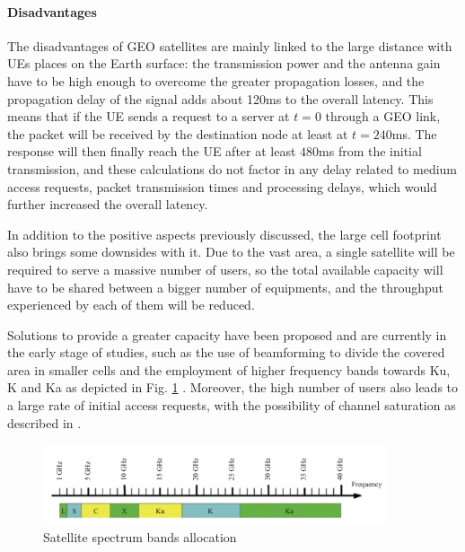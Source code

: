 \paragraph{Disadvantages}
The disadvantages of \ac{GEO} satellites are mainly linked to the large distance with \ac{UE}s places on the Earth surface: the transmission power and the antenna gain have to be high enough to overcome the greater propagation losses, and the propagation delay of the signal adds about 120ms to the overall latency. This means that if the \ac{UE} sends a request to a server at $t=0$ through a \ac{GEO} link, the packet will be received by the destination node at least at $t=240$ms. The response will then finally reach the \ac{UE} after at least $480$ms from the initial transmission, and these calculations do not factor in any delay related to medium access requests, packet transmission times and processing delays, which would further increased the overall latency.

In addition to the positive aspects previously discussed, the large cell footprint also brings some downsides with it. Due to the vast area, a single satellite will be required to serve a massive number of users, so the total available capacity will have to be shared between a bigger number of equipments, and the throughput experienced by each of them will be reduced.

Solutions to provide a greater capacity have been proposed and are currently in the early stage of studies, such as the use of beamforming to divide the covered area in smaller cells and the employment of higher frequency bands towards Ku, K and Ka as depicted in Fig. \ref{fig:satellite-bands} \cite{advances-comm-sat-sys}.
Moreover, the high number of users also leads to a large rate of initial access requests, with the possibility of channel saturation as described in \cite{3gpp-tr-38.811}.

\begin{figure}[ht]
    \centering
    \includegraphics[width=0.9\textwidth]{res/satellite-bands.png}
    \caption{Satellite spectrum bands allocation \cite{advances-comm-sat-sys}}
    \label{fig:satellite-bands}
\end{figure}

